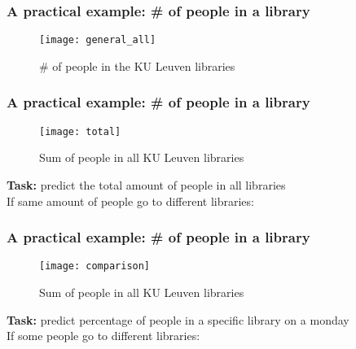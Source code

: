 \begin{frame}
\frametitle{A practical example: \# of people in a library}
\begin{figure}
	\texttt{[image: general\_all]}
	\caption	{\# of people in the KU Leuven libraries}
\end{figure}

\end{frame}

\begin{frame}
\frametitle{A practical example: \# of people in a library}
\begin{figure}
	\texttt{[image: total]}
	\caption	{Sum of people in all KU Leuven libraries}
\end{figure}
\textbf{Task:} predict the total amount of people in all libraries\\
If same amount of people go to different libraries: 
\end{frame}
\begin{frame}
\frametitle{A practical example: \# of people in a library}
\begin{figure}
	\texttt{[image: comparison]}
	\caption	{Sum of people in all KU Leuven libraries}
\end{figure}
\textbf{Task:} predict percentage of people in a specific library on a monday\\
If some people go to different libraries: 
\end{frame}

